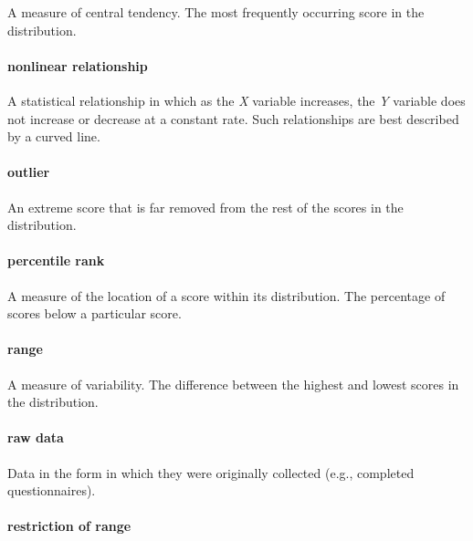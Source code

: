 \documentclass[
]{krantz}
\begin{document}
A measure of central tendency. The most frequently occurring score in the distribution.

\hypertarget{nonlinear-relationship}{%
\paragraph*{nonlinear relationship}\label{nonlinear-relationship}}

A statistical relationship in which as the \emph{X} variable increases, the \emph{Y} variable does not increase or decrease at a constant rate. Such relationships are best described by a curved line.

\hypertarget{outlier}{%
\paragraph*{outlier}\label{outlier}}

An extreme score that is far removed from the rest of the scores in the distribution.

\hypertarget{percentile-rank}{%
\paragraph*{percentile rank}\label{percentile-rank}}

A measure of the location of a score within its distribution. The percentage of scores below a particular score.

\hypertarget{range}{%
\paragraph*{range}\label{range}}

A measure of variability. The difference between the highest and lowest scores in the distribution.

\hypertarget{raw-data}{%
\paragraph*{raw data}\label{raw-data}}

Data in the form in which they were originally collected (e.g., completed questionnaires).

\hypertarget{restriction-of-range}{%
\paragraph*{restriction of range}\label{restriction-of-range}}
\end{document}
